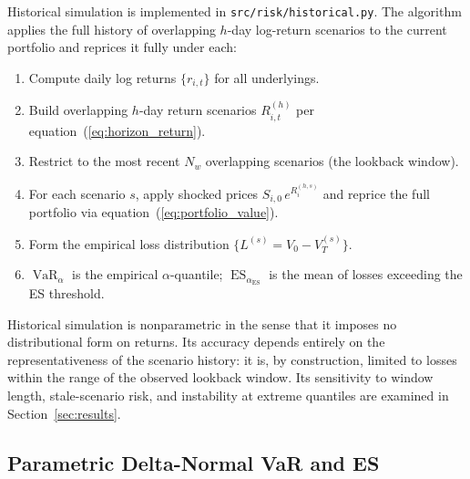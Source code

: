 \documentclass[11pt]{article}
\newcommand{\code}[1]{\texttt{#1}}
\DeclareMathOperator{\VaR}{VaR}
\DeclareMathOperator{\ES}{ES}
\begin{document}
Historical simulation is implemented in \code{src/risk/historical.py}.  The
algorithm applies the full history of overlapping $h$-day log-return scenarios
to the current portfolio and reprices it fully under each:

\begin{enumerate}
  \item Compute daily log returns $\{r_{i,t}\}$ for all underlyings.
  \item Build overlapping $h$-day return scenarios $R_{i,t}^{(h)}$ per
        equation~(\ref{eq:horizon_return}).
  \item Restrict to the most recent $N_w$ overlapping scenarios (the lookback
        window).
  \item For each scenario $s$, apply shocked prices $S_{i,0}\,e^{R_{i}^{(h,s)}}$
        and reprice the full portfolio via equation~(\ref{eq:portfolio_value}).
  \item Form the empirical loss distribution $\{L^{(s)} = V_0 - V_T^{(s)}\}$.
  \item $\VaR_\alpha$ is the empirical $\alpha$-quantile; $\ES_{\alpha_{\mathrm{ES}}}$
        is the mean of losses exceeding the ES threshold.
\end{enumerate}

Historical simulation is nonparametric in the sense that it imposes no
distributional form on returns.  Its accuracy depends entirely on the
representativeness of the scenario history: it is, by construction, limited to
losses within the range of the observed lookback window.  Its sensitivity to
window length, stale-scenario risk, and instability at extreme quantiles are
examined in Section~\ref{sec:results}.

\subsection{Parametric Delta-Normal VaR and ES}
\end{document}
